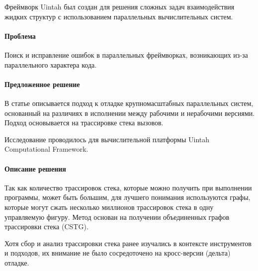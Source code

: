 Фреймворк Uintah был создан для решения сложных задач взаимодействия жидких структур с использованием параллельных вычислительных систем.

\paragraph{Проблема}

Поиск и исправление ошибок в параллельных фреймворках, возникающих из-за параллельного характера кода.

\paragraph{Предложенное решение}

В статье описывается подход к отладке крупномасштабных параллельных систем, основанный на различиях в исполнении между рабочими и нерабочими версиями. Подход основывается на трассировке стека вызовов.

Исследование проводилось для вычислительной платформы Uintah Computational Framework.

\paragraph{Описание решения}

Так как количество трассировок стека, которые можно получить при выполнении программы, может быть большим, для лучшего понимания используются графы, которые могут сжать несколько миллионов трассировок стека в одну управляемую фигуру. Метод основан на получении объединенных графов трассировки стека (CSTG). 

Хотя сбор и анализ трассировки стека ранее изучались в контексте инструментов и подходов, их внимание не было сосредоточено на кросс-версии (дельта) отладке.

